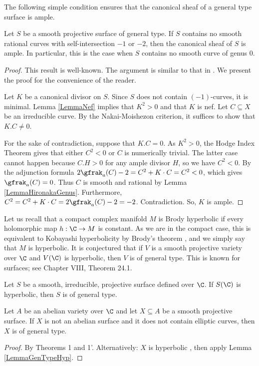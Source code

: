 The following simple condition ensures that the canonical sheaf of a general type surface is ample.

\begin{lemma}
\notready\label{LemmaGTA} Let $S$ be a smooth projective surface of general type. If $S$ contains no smooth rational curves with self-intersection $-1$ or $-2$, then the canonical sheaf of $S$ is ample.  In particular, this is the case when $S$ contains no smooth curve of genus $0$.
\end{lemma}
\begin{proof} This result is well-known. The argument is similar to that in \cite{MumfordApp}. We present the proof for the convenience of the reader.

 Let $K$ be a canonical divisor on $S$. Since $S$ does not contain $(-1)$-curves, it is minimal. Lemma \ref{LemmaNef} implies that $K^2>0$ and that $K$ is nef. Let $C\subseteq X$ be an irreducible curve. By the Nakai-Moishezon criterion, it suffices to show that $K.C\ne 0$.

For the sake of contradiction, suppose that $K.C=0$. As $K^2>0$, the Hodge Index Theorem gives that either $C^2<0$ or $C$ is numerically trivial. The latter case cannot happen because $C.H>0$ for any ample divisor $H$, so we have $C^2<0$. By the adjunction formula $2\gfrak_a(C)-2 = C^2 +K\cdot C = C^2< 0$, which gives $\gfrak_a(C) = 0$. Thus $C$ is smooth and rational by Lemma \ref{LemmaHironakaGenus}. Furthermore, $C^2=C^2 +K\cdot C=2\gfrak_a(C)-2=-2$. Contradiction. So, $K$ is ample.
\end{proof}
Let us recall that a compact complex manifold $M$ is Brody hyperbolic if every holomorphic map $h:\C\to M$ is constant. As we are in the compact case, this is equivalent to Kobayashi hyperbolicity by Brody's theorem \cite{Brody}, and we simply say that $M$ is hyperbolic. It is conjectured that if $V$ is a smooth projective variety over $\C$ and  $V(\C)$ is hyperbolic, then $V$ is of general type. This is known for surfaces; see \cite{BHPV} Chapter VIII, Theorem 24.1.
\begin{lemma}
\notready\label{LemmaGenTypeHyp} Let $S$ be a smooth, irreducible,  projective surface defined over $\C$. If $S(\C)$ is hyperbolic, then $S$ is of general type.
\end{lemma}




\begin{lemma}
\notready\label{LemmaGenTypeTranslate} Let $A$ be an abelian variety over $\C$ and let $X\subseteq A$ be a smooth projective surface. If $X$ is not an abelian surface and it does not contain elliptic curves, then $X$ is of general type.
\end{lemma}
\begin{proof}
By \cite{Yau} Theorems 1 and 1'. Alternatively:  $X$ is hyperbolic \cite{Green}, then apply  Lemma \ref{LemmaGenTypeHyp}.
\end{proof}

